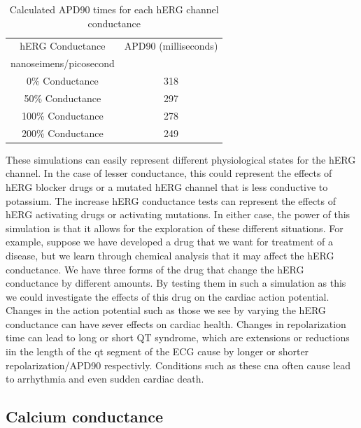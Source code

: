 \documentclass[11pt]{article}
\begin{document}
\begin{table}[H]
	\centering
	\caption{Calculated APD90 times for each hERG channel conductance}
	\label{tab:potassium}
	\begin{tabular}{cc}
		\hline \hline
		hERG Conductance & APD90 (milliseconds)\\ 
		nanoseimens/picosecond &  \\
		\hline
		0\% Conductance & 318\\ 
		50\% Conductance &  297\\ 
		
		100\% Conductance &  278\\ 
		
		200\% Conductance&  249\\ 
		
		
		\hline 
		\hline
	\end{tabular} 
\end{table}
\par{}
These simulations can easily represent different physiological states for the hERG channel. In the case of lesser conductance, this could represent the effects of hERG blocker drugs or a mutated hERG channel that is less conductive to potassium. The increase hERG conductance tests can represent the effects of hERG activating drugs or activating mutations. In either case, the power of this simulation is that it allows for the exploration of these different situations. For example, suppose we have developed a drug that we want for treatment of a disease, but we learn through chemical analysis that it may affect the hERG conductance. We have three forms of the drug that change the hERG conductance by different amounts. By testing them in such a simulation as this we could investigate the effects of this drug on the cardiac action potential. Changes in the action potential such as those we see by varying the hERG conductance can have sever effects on cardiac health. Changes in repolarization time can lead to long or short QT syndrome, which are extensions or reductions iin the length of the qt segment of the ECG cause by longer or shorter repolarization/APD90 respectivly. Conditions such as these cna often cause lead to arrhythmia and even sudden cardiac death. 

\subsection{Calcium conductance}
\end{document}
